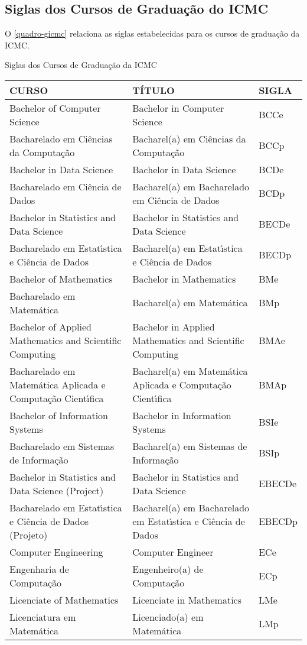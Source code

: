 \begin{apendicesenv}
\chapter{Siglas dos Cursos de Gradua\c{c}\~ao do ICMC}
O \autoref{quadro-gicmc} relaciona as siglas estabelecidas para os cursos de gradua\c{c}\~ao da ICMC.
\begin{quadro}[Htb]
	\ABNTEXfontereduzida
	\caption[Siglas dos Cursos de Gradua\c{c}\~ao da ICMC]{Siglas dos Cursos de Gradua\c{c}\~ao da ICMC}
	\label{quadro-gicmc}
	\begin{tabular}{|p{6.5cm}|p{6.5cm}|p{1.75cm}|}
		\hline
		\textbf{CURSO} & \textbf{T\'ITULO} &  \textbf{SIGLA}  \\
		\hline
		Bachelor of Computer Science & Bachelor in Computer Science & BCCe\\
		Bacharelado em Ci\^encias da Computa\c{c}\~ao & Bacharel(a) em Ci\^encias da Computa\c{c}\~ao & BCCp\\
		Bachelor in Data Science & Bachelor in Data Science & BCDe\\
		Bacharelado em Ci\^encia de Dados & Bacharel(a) em Bacharelado em Ci\^encia de Dados & BCDp\\
		Bachelor in Statistics and Data Science & Bachelor in Statistics and Data Science & BECDe\\
		Bacharelado em Estat\'{\i}stica e Ci\^encia de Dados & Bacharel(a) em Estat\'{\i}stica e Ci\^encia de Dados & BECDp\\
		Bachelor of Mathematics & Bachelor in Mathematics & BMe\\
		Bacharelado em Matem\'atica & Bacharel(a) em Matem\'atica & BMp\\
		Bachelor of Applied Mathematics and Scientific Computing & Bachelor in Applied Mathematics and Scientific Computing & BMAe\\
		Bacharelado em Matem\'atica Aplicada e Computa\c{c}\~ao Cient\'{\i}fica & Bacharel(a) em Matem\'atica Aplicada e Computa\c{c}\~ao Cient\'{\i}fica & BMAp\\
		Bachelor of Information Systems & Bachelor in Information Systems & BSIe\\
		Bacharelado em Sistemas de Informa\c{c}\~ao & Bacharel(a) em Sistemas de Informa\c{c}\~ao & BSIp\\
		Bachelor in Statistics and Data Science (Project) & Bachelor in Statistics and Data Science & EBECDe\\
		Bacharelado em Estat\'{\i}stica e Ci\^encia de Dados (Projeto) & Bacharel(a) em Bacharelado em Estat\'{\i}stica e Ci\^encia de Dados & EBECDp\\
		Computer Engineering & Computer Engineer & ECe\\
		Engenharia de Computa\c{c}\~ao & Engenheiro(a) de Computa\c{c}\~ao & ECp\\
		Licenciate of  Mathematics & Licenciate in Mathematics & LMe\\
		Licenciatura em Matem\'atica & Licenciado(a) em Matem\'atica & LMp\\
	    \hline
		

\end{tabular}
\end{quadro}
\end{apendicesenv}
